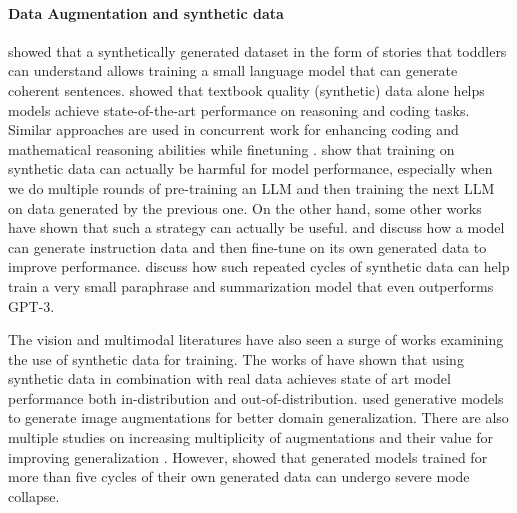 \paragraph{Data Augmentation and synthetic data}
\citet{eldan2023tinystories} showed that a synthetically generated dataset in the form of stories that toddlers can understand
allows training a small language model that can generate coherent sentences.
\citet{gunasekar2023textbooks} showed that textbook quality (synthetic) data alone helps models achieve state-of-the-art performance on reasoning and coding tasks. Similar approaches are used in concurrent work for enhancing coding and mathematical reasoning abilities while finetuning \cite{liu2023tinygsm,wei2023magicoder}.
\citet{shumailov2023model} show that training on synthetic data can actually be harmful for model performance, especially when
we do multiple rounds of pre-training an LLM and then training the next LLM on data generated by the previous one.
On the other hand, some other works have shown that such a strategy can actually be useful.
\citet{li2023self} and \citet{koksal2023longform} discuss how a model can generate instruction data and then fine-tune on its own generated data
to improve performance.
\citet{jung2023impossible} discuss how such repeated cycles of synthetic data can help train a very small paraphrase and summarization model that even outperforms GPT-3.

The vision and multimodal literatures have also seen a surge of works examining the use of synthetic data for training.
The works of \citet{bansal2023leaving,trabucco2023effective,azizi2023synthetic} have shown that using synthetic data in 
combination with real data achieves state of art model performance both in-distribution and out-of-distribution. \citet{cubuk2020randaugment} used generative models to generate image augmentations for better domain generalization. There are also multiple studies on increasing multiplicity of augmentations and their value for improving generalization \citep{choi2019faster,fort2021drawing,hoffer2020augment}.  
However, \citet{alemohammad2023self} showed that generated models trained for more than five cycles of their own generated data can undergo severe mode collapse.

